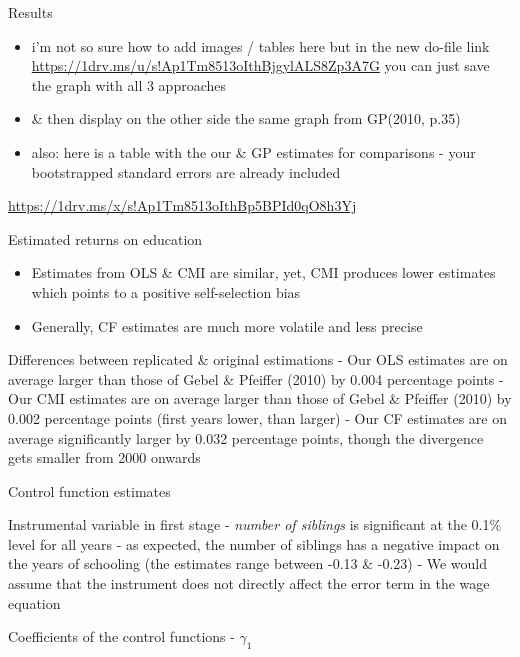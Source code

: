 \documentclass[10pt,ignorenonframetext,]{beamer}
\providecommand{\tightlist}{%
  \setlength{\itemsep}{0pt}\setlength{\parskip}{0pt}}
\begin{document}
\begin{frame}{Results}
\protect\hypertarget{results}{}

\begin{itemize}
\item
  i'm not so sure how to add images / tables here but in the new do-file
  link \url{https://1drv.ms/u/s!Ap1Tm8513oIthBjgylALS8Zp3A7G} you can
  just save the graph with all 3 approaches
\item
  \& then display on the other side the same graph from GP(2010, p.35)
\item
  also: here is a table with the our \& GP estimates for comparisons -
  your bootstrapped standard errors are already included
\end{itemize}

\url{https://1drv.ms/x/s!Ap1Tm8513oIthBp5BPId0qO8h3Yj}

\end{frame}

\begin{frame}{Estimated returns on education}
\protect\hypertarget{estimated-returns-on-education}{}

\begin{itemize}
\tightlist
\item
  Estimates from OLS \& CMI are similar, yet, CMI produces lower
  estimates which points to a positive self-selection bias
\item
  Generally, CF estimates are much more volatile and less precise
\end{itemize}

Differences between replicated \& original estimations - Our OLS
estimates are on average larger than those of Gebel \& Pfeiffer (2010)
by 0.004 percentage points - Our CMI estimates are on average larger
than those of Gebel \& Pfeiffer (2010) by 0.002 percentage points (first
years lower, than larger) - Our CF estimates are on average
significantly larger by 0.032 percentage points, though the divergence
gets smaller from 2000 onwards

\end{frame}

\begin{frame}{Control function estimates}
\protect\hypertarget{control-function-estimates}{}

Instrumental variable in first stage - \emph{number of siblings} is
significant at the 0.1\% level for all years - as expected, the number
of siblings has a negative impact on the years of schooling (the
estimates range between -0.13 \& -0.23) - We would assume that the
instrument does not directly affect the error term in the wage equation

Coefficients of the control functions - \(\gamma_1\)

\end{frame}
\end{document}
